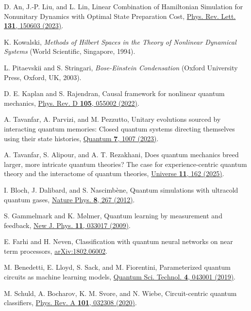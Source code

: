 \documentclass[aps,pra,twocolumn,floatfix,groupedaddress,superscriptaddress,nofootinbib,notitlepage]{revtex4-2}
\begin{document}
\begin{thebibliography}{100}
 D. An, J.-P. Liu, and L. Lin, Linear Combination of Hamiltonian Simulation for Nonunitary Dynamics with Optimal State Preparation Cost, \href{https://doi.org/10.1103/PhysRevLett.131.150603}{Phys. Rev. Lett. \textbf{131}, 150603 (2023)}.

 K. Kowalski, \emph{Methods of Hilbert Spaces in the Theory of Nonlinear Dynamical Systems} (World Scientific, Singapore, 1994).

 L. Pitaevskii and S. Stringari, \emph{Bose-Einstein Condensation} (Oxford University Press, Oxford, UK, 2003).

 D. E. Kaplan and S. Rajendran, Causal framework for nonlinear quantum mechanics, \href{https://doi.org/10.1103/PhysRevD.105.055002}{Phys. Rev. D \textbf{105}, 055002 (2022)}.

 A. Tavanfar, A. Parvizi, and M. Pezzutto, Unitary evolutions sourced by interacting quantum memories: Closed quantum systems directing themselves using their state histories, \href{https://doi.org/10.22331/q-2023-05-15-1007}{Quantum \textbf{7}, 1007 (2023)}.

 A. Tavanfar, S. Alipour, and A. T. Rezakhani, Does quantum mechanics breed larger, more intricate quantum theories? The case for experience-centric quantum theory and the interactome of quantum theories, \href{https://doi.org/10.3390/universe11050162}{Universe \textbf{11}, 162 (2025)}.

 I. Bloch, J. Dalibard, and S. Nascimb\`ene,  Quantum simulations with ultracold quantum gases, \href{https://doi.org/10.1038/nphys2259}{Nature Phys. \textbf{8}, 267 (2012)}.

 S. Gammelmark and K. M{\o}lmer, Quantum learning by measurement and feedback, \href{https://doi.org/10.1088/1367-2630/11/3/033017}{New J. Phys. \textbf{11}, 033017 (2009)}.

 E. Farhi and H. Neven, Classification with quantum neural networks on near term processors, \href{https://arxiv.org/abs/1802.06002}{arXiv:1802.06002}.

M. Benedetti, E. Lloyd, S. Sack, and M. Fiorentini, Parameterized quantum circuits as machine learning models, \href{https://doi.org/10.1088/2058-9565/ab4eb5}{Quantum Sci. Technol. \textbf{4}, 043001 (2019)}.

 M. Schuld, A. Bocharov, K. M. Svore, and N. Wiebe, Circuit-centric quantum classifiers, \href{https://doi.org/10.1103/PhysRevA.101.032308}{Phys. Rev. A \textbf{101}, 032308 (2020)}.


\end{thebibliography}
\end{document}
